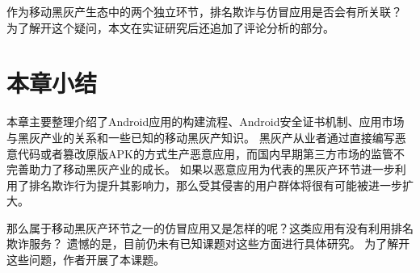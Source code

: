 作为移动黑灰产生态中的两个独立环节，排名欺诈与仿冒应用是否会有所关联？
为了解开这个疑问，本文在实证研究后还追加了评论分析的部分。

\section{本章小结}
本章主要整理介绍了Android应用的构建流程、Android安全证书机制、应用市场与黑灰产业的关系和一些已知的移动黑灰产知识。
黑灰产从业者通过直接编写恶意代码或者篡改原版APK的方式生产恶意应用，而国内早期第三方市场的监管不完善助力了移动黑灰产业的成长。
如果以恶意应用为代表的黑灰产环节进一步利用了排名欺诈行为提升其影响力，那么受其侵害的用户群体将很有可能被进一步扩大。

那么属于移动黑灰产环节之一的仿冒应用又是怎样的呢？这类应用有没有利用排名欺诈服务？
遗憾的是，目前仍未有已知课题对这些方面进行具体研究。
为了解开这些问题，作者开展了本课题。
